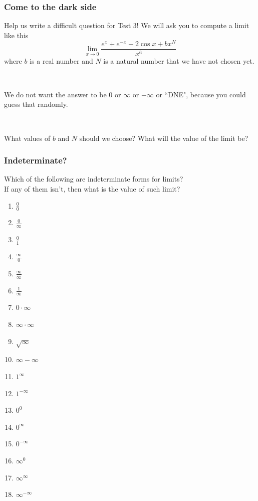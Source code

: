 \documentclass[14pt]{beamer}
\newcommand {\DS} [1] {${\displaystyle #1}$}
\newcommand{\setsize}[1]{\fontsize{#1}{#1}\selectfont} %
\newcommand{\smallerfont}{\setsize{13}} %
\begin{document}
\begin{frame}[t]
\smallerfont
\frametitle{Come to the dark side}

Help us write a difficult question for Test 3!  We will ask you to compute a limit like this
	$$
		\lim_{x \to 0} \frac{e^x + e^{-x} - 2 \cos x + bx^N}{x^6}
	$$
where $b$ is a real number and $N$ is a natural number that we have not chosen yet.

\

We do not want the answer to be $0$ or $\infty$ or $-\infty$ or ``DNE", because you could guess that randomly.  

\

What values of $b$ and $N$ should we choose?  What will the value of the limit be?

\end{frame}
\begin{frame}[t]
\frametitle{Indeterminate?}

Which of the following are indeterminate forms for limits? \\
If any of them isn't, then what is the value of such limit?

\begin{multicols}{4}
\begin{enumerate}
  \setlength\itemsep{1em}
	\item \DS{\frac{0}{0}}
	\item \DS{\frac{0}{\infty}}
	\item \DS{\frac{0}{1}}
	\item \DS{\frac{\infty}{0}}
	\item \DS{\frac{\infty}{\infty}}
	\item \DS{\frac{1}{\infty}}
	\item \DS{0 \cdot \infty} \phantom{\DS{\frac 11}}
	\item \DS{\infty \cdot \infty} \phantom{\DS{\frac 11}}
	\item \DS{\sqrt{\infty}}
	\item \DS{\infty - \infty}
	\item \DS{1^{\infty}}
	\item \DS{1^{-\infty}}
	\item \DS{0^0}
	\item \DS{0^{\infty}}
	\item \DS{0^{-\infty}}
	\item \DS{\infty^0}
	\item \DS{\infty^\infty}
	\item \DS{\infty^{-\infty}}	
\end{enumerate}
\end{multicols}

\end{frame}
\end{document}

